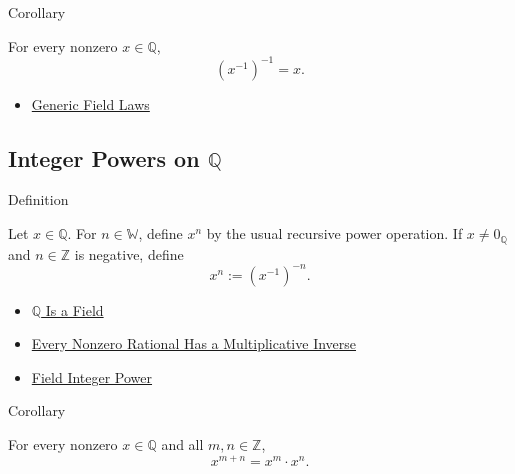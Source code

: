 \begin{corollarybox}{Corollary}
\begin{corollary}
\label{cor:inverse-of-inverse-on-q}
For every nonzero $x\in\mathbb{Q}$,
\[
(x^{-1})^{-1}=x.
\]
\end{corollary}
\end{corollarybox}

\begin{dependencies}
\begin{itemize}
  \item \hyperref[cor:generic-field-laws]{Generic Field Laws}
\end{itemize}
\end{dependencies}

\subsection*{Integer Powers on $\mathbb{Q}$}

\begin{definitionbox}{Definition}
\begin{definition}
\label{def:integer-power-on-q}
Let $x\in\mathbb{Q}$. For $n\in\mathbb{W}$, define $x^n$ by the usual
recursive power operation. If $x\ne 0_{\mathbb{Q}}$ and $n\in\mathbb{Z}$ is
negative, define
\[
x^n:=(x^{-1})^{-n}.
\]
\end{definition}
\end{definitionbox}

\begin{dependencies}
\begin{itemize}
  \item \hyperref[thm:q-is-a-field]{$\mathbb{Q}$ Is a Field}
  \item \hyperref[thm:every-nonzero-rational-has-multiplicative-inverse]{Every Nonzero Rational Has a Multiplicative Inverse}
  \item \hyperref[def:field-integer-power]{Field Integer Power}
\end{itemize}
\end{dependencies}

\begin{corollarybox}{Corollary}
\begin{corollary}
\label{cor:exponent-addition-on-q}
For every nonzero $x\in\mathbb{Q}$ and all $m,n\in\mathbb{Z}$,
\[
x^{m+n}=x^m\cdot x^n.
\]
\end{corollary}
\end{corollarybox}

